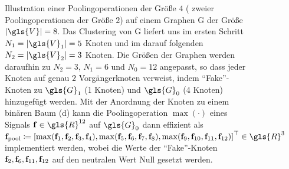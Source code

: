 \begin{figure}[t]
{
}
\caption[Pooling auf Graphen]{Illustration einer Poolingoperationen der Größe $4$ (\bzw{} zweier Poolingoperationen der Größe $2$) auf einem Graphen \gls{G} der Größe $\left|\gls{V}\right| = 8$.
Das Clustering von \gls{G} liefert uns im ersten Schritt $N_1 =\left|\gls{V}_1\right| = 5$ Knoten und im darauf folgenden $N_2 = \left|\gls{V}_2\right| = 3$ Knoten.
Die Größen der Graphen werden daraufhin zu $N_2 = 3$, $N_1 = 6$ und $N_0 = 12$ angepasst, so dass jeder Knoten auf genau $2$ Vorgängerknoten verweist, indem \enquote{Fake}-Knoten zu $\gls{G}_1$ (1 Knoten) und $\gls{G}_0$ (4 Knoten) hinzugefügt werden.
Mit der Anordnung der Knoten zu einem binären Baum (d) kann die Poolingoperation $\max\left(\cdot\right)$ eines Signals $\ve{f} \in \gls{R}^{12}$ auf $\gls{G}_0$ dann effizient als $\ve{f}_{\mathrm{pool}} \coloneqq {\left[ \max\left(\ve{f}_1, \ve{f}_2, \ve{f}_3, \ve{f}_4 \right), \max\left(\ve{f}_5, \ve{f}_6, \ve{f}_7, \ve{f}_8 \right), \max\left(\ve{f}_9, \ve{f}_{10}, \ve{f}_{11}, \ve{f}_{12} \right) \right]}^{\top} \in \gls{R}^3$ implementiert werden, wobei die Werte der \enquote{Fake}-Knoten $\mathbf{f}_2, \mathbf{f}_6, \mathbf{f}_{11}, \mathbf{f}_{12}$ auf den neutralen Wert Null gesetzt werden.}
\label{fig:pooling}
\end{figure}

